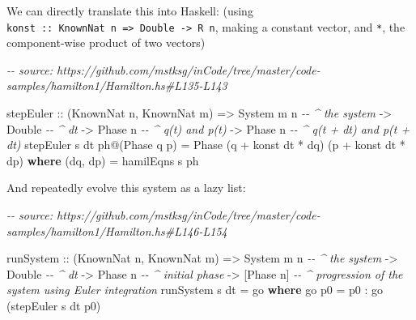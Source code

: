 \documentclass[]{article}
\newenvironment{Shaded}{}{}
\newcommand{\CommentTok}[1]{\textcolor[rgb]{0.38,0.63,0.69}{\textit{#1}}}
\newcommand{\DataTypeTok}[1]{\textcolor[rgb]{0.56,0.13,0.00}{#1}}
\newcommand{\KeywordTok}[1]{\textcolor[rgb]{0.00,0.44,0.13}{\textbf{#1}}}
\newcommand{\NormalTok}[1]{#1}
\newcommand{\OperatorTok}[1]{\textcolor[rgb]{0.40,0.40,0.40}{#1}}
\newcommand{\OtherTok}[1]{\textcolor[rgb]{0.00,0.44,0.13}{#1}}
\begin{document}
We can directly translate this into Haskell: (using
\texttt{konst\ ::\ KnownNat\ n\ =\textgreater{}\ Double\ -\textgreater{}\ R\ n},
making a constant vector, and \texttt{*}, the component-wise product of two
vectors)

\begin{Shaded}
\begin{Highlighting}[]
\CommentTok{{-}{-} source: https://github.com/mstksg/inCode/tree/master/code{-}samples/hamilton1/Hamilton.hs\#L135{-}L143}

\NormalTok{stepEuler}
\OtherTok{    ::}\NormalTok{ (}\DataTypeTok{KnownNat}\NormalTok{ n, }\DataTypeTok{KnownNat}\NormalTok{ m)}
    \OtherTok{=>} \DataTypeTok{System}\NormalTok{ m n       }\CommentTok{{-}{-} \^{} the system}
    \OtherTok{{-}>} \DataTypeTok{Double}           \CommentTok{{-}{-} \^{} dt}
    \OtherTok{{-}>} \DataTypeTok{Phase}\NormalTok{ n          }\CommentTok{{-}{-} \^{} q(t) and p(t)}
    \OtherTok{{-}>} \DataTypeTok{Phase}\NormalTok{ n          }\CommentTok{{-}{-} \^{} q(t + dt) and p(t + dt)}
\NormalTok{stepEuler s dt ph}\OperatorTok{@}\NormalTok{(}\DataTypeTok{Phase}\NormalTok{ q p) }\OtherTok{=} \DataTypeTok{Phase}\NormalTok{ (q }\OperatorTok{+}\NormalTok{ konst dt }\OperatorTok{*}\NormalTok{ dq) (p }\OperatorTok{+}\NormalTok{ konst dt }\OperatorTok{*}\NormalTok{ dp)}
  \KeywordTok{where}
\NormalTok{    (dq, dp) }\OtherTok{=}\NormalTok{ hamilEqns s ph}
\end{Highlighting}
\end{Shaded}

And repeatedly evolve this system as a lazy list:

\begin{Shaded}
\begin{Highlighting}[]
\CommentTok{{-}{-} source: https://github.com/mstksg/inCode/tree/master/code{-}samples/hamilton1/Hamilton.hs\#L146{-}L154}

\NormalTok{runSystem}
\OtherTok{    ::}\NormalTok{ (}\DataTypeTok{KnownNat}\NormalTok{ n, }\DataTypeTok{KnownNat}\NormalTok{ m)}
    \OtherTok{=>} \DataTypeTok{System}\NormalTok{ m n       }\CommentTok{{-}{-} \^{} the system}
    \OtherTok{{-}>} \DataTypeTok{Double}           \CommentTok{{-}{-} \^{} dt}
    \OtherTok{{-}>} \DataTypeTok{Phase}\NormalTok{ n          }\CommentTok{{-}{-} \^{} initial phase}
    \OtherTok{{-}>}\NormalTok{ [}\DataTypeTok{Phase}\NormalTok{ n]        }\CommentTok{{-}{-} \^{} progression of the system using Euler integration}
\NormalTok{runSystem s dt }\OtherTok{=}\NormalTok{ go}
  \KeywordTok{where}
\NormalTok{    go p0 }\OtherTok{=}\NormalTok{ p0 }\OperatorTok{:}\NormalTok{ go (stepEuler s dt p0)}
\end{Highlighting}
\end{Shaded}
\end{document}
